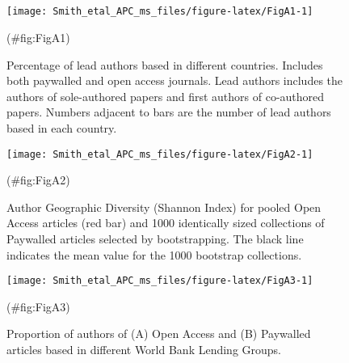 \clearpage
\makeatletter
\efloat@restorefloats
\makeatother


\begin{appendix}
\section{}
\begin{figure}

{\centering \texttt{[image: Smith\_etal\_APC\_ms\_files/figure-latex/FigA1-1]} 

}

\caption{Percentage of lead authors based in different countries. Includes both paywalled and open access journals. Lead authors includes the authors of sole-authored papers and first authors of co-authored papers. Numbers adjacent to bars are the number of lead authors based in each country.}(\#fig:FigA1)
\end{figure}

\begin{figure}

{\centering \texttt{[image: Smith\_etal\_APC\_ms\_files/figure-latex/FigA2-1]} 

}

\caption{Author Geographic Diversity (Shannon Index) for pooled Open Access articles (red bar) and 1000 identically sized collections of Paywalled articles selected by bootstrapping. The black line indicates the mean value for the 1000 bootstrap collections.}(\#fig:FigA2)
\end{figure}

\begin{figure}

{\centering \texttt{[image: Smith\_etal\_APC\_ms\_files/figure-latex/FigA3-1]} 

}

\caption{Proportion of authors of (A) Open Access and (B) Paywalled articles based in different World Bank Lending Groups.}(\#fig:FigA3)
\end{figure}

\newpage
\blandscape
\begin{table}


\end{table}
\end{appendix}
